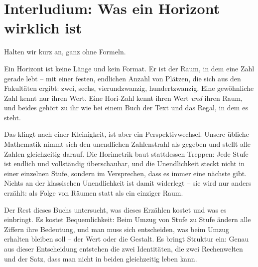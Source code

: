 \chapter*{Interludium: Was ein Horizont wirklich ist}

\begin{oberflaeche}
Halten wir kurz an, ganz ohne Formeln.

Ein Horizont ist keine Länge und kein Format. Er ist der Raum, in dem
eine Zahl gerade lebt -- mit einer festen, endlichen Anzahl von
Plätzen, die sich aus den Fakultäten ergibt: zwei, sechs,
vierundzwanzig, hundertzwanzig. Eine gewöhnliche Zahl kennt nur
ihren Wert. Eine Hori-Zahl kennt ihren Wert \emph{und} ihren Raum,
und beides gehört zu ihr wie bei einem Buch der Text und das Regal,
in dem es steht.

Das klingt nach einer Kleinigkeit, ist aber ein Perspektivwechsel.
Unsere übliche Mathematik nimmt sich den unendlichen Zahlenstrahl
als gegeben und stellt alle Zahlen gleichzeitig darauf. Die
Horimetrik baut stattdessen Treppen: Jede Stufe ist endlich und
vollständig überschaubar, und die Unendlichkeit steckt nicht in
einer einzelnen Stufe, sondern im Versprechen, dass es immer eine
nächste gibt. Nichts an der klassischen Unendlichkeit ist damit
widerlegt -- sie wird nur anders erzählt: als Folge von Räumen statt
als ein einziger Raum.

Der Rest dieses Buchs untersucht, was dieses Erzählen kostet und was
es einbringt. Es kostet Bequemlichkeit: Beim Umzug von Stufe zu
Stufe ändern alle Ziffern ihre Bedeutung, und man muss sich
entscheiden, was beim Umzug erhalten bleiben soll -- der Wert oder
die Gestalt. Es bringt Struktur ein: Genau aus dieser Entscheidung
entstehen die zwei Identitäten, die zwei Rechenwelten und der Satz,
dass man nicht in beiden gleichzeitig leben kann.
\end{oberflaeche}
